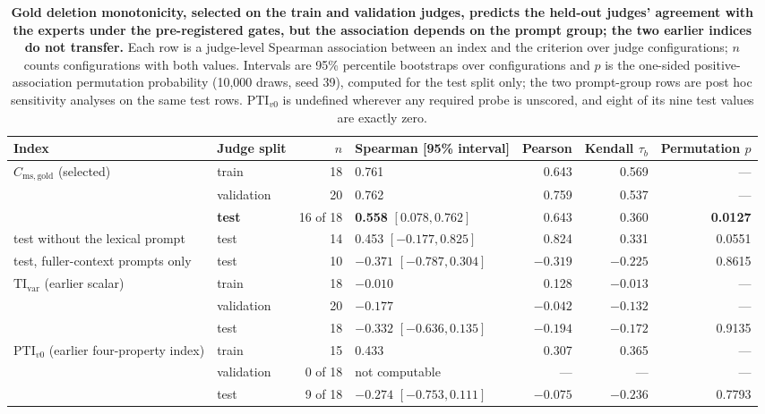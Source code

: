 \begin{table}[t]
\centering\small
\begin{adjustbox}{max width=\linewidth}
\begin{tabular}{@{}llrlrrr@{}}
\toprule
Index & Judge split & $n$ & Spearman [95\% interval] & Pearson & Kendall $\tau_b$ & Permutation $p$ \\
\midrule
$C_{\mathrm{ms,gold}}$ (selected) & train & 18 & 0.761 & 0.643 & 0.569 & --- \\
 & validation & 20 & 0.762 & 0.759 & 0.537 & --- \\
 & \textbf{test} & 16 of 18 & \textbf{0.558} $[0.078, 0.762]$ & 0.643 & 0.360 & \textbf{0.0127} \\
\quad test without the lexical prompt & test & 14 & 0.453 $[-0.177, 0.825]$ & 0.824 & 0.331 & 0.0551 \\
\quad test, fuller-context prompts only & test & 10 & $-0.371$ $[-0.787, 0.304]$ & $-0.319$ & $-0.225$ & 0.8615 \\
\midrule
$\mathrm{TI}_{\mathrm{var}}$ (earlier scalar) & train & 18 & $-0.010$ & 0.128 & $-0.013$ & --- \\
 & validation & 20 & $-0.177$ & $-0.042$ & $-0.132$ & --- \\
 & test & 18 & $-0.332$ $[-0.636, 0.135]$ & $-0.194$ & $-0.172$ & 0.9135 \\
\midrule
$\mathrm{PTI}_{v0}$ (earlier four-property index) & train & 15 & 0.433 & 0.307 & 0.365 & --- \\
 & validation & 0 of 18 & not computable & --- & --- & --- \\
 & test & 9 of 18 & $-0.274$ $[-0.753, 0.111]$ & $-0.075$ & $-0.236$ & 0.7793 \\
\bottomrule
\end{tabular}
\end{adjustbox}
\caption{\textbf{Gold deletion monotonicity, selected on the train and validation judges, predicts the held-out judges' agreement with the experts under the pre-registered gates, but the association depends on the prompt group; the two earlier indices do not transfer.} Each row is a judge-level Spearman association between an index and the criterion over judge configurations; $n$ counts configurations with both values.
Intervals are 95\% percentile bootstraps over configurations and $p$ is the one-sided positive-association permutation probability (10{,}000 draws, seed 39), computed for the test split only; the two prompt-group rows are post hoc sensitivity analyses on the same test rows.
$\mathrm{PTI}_{v0}$ is undefined wherever any required probe is unscored, and eight of its nine test values are exactly zero.}
\label{tab:transfer}
\end{table}

